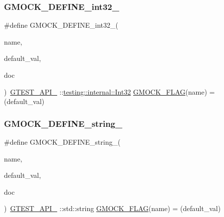 \mbox{\label{gmock-port_8h_a19d91081ff0aaab2f60ef1dc2d6e6b34}} 
\subsubsection{\texorpdfstring{G\+M\+O\+C\+K\+\_\+\+D\+E\+F\+I\+N\+E\+\_\+int32\+\_\+}{GMOCK\_DEFINE\_int32\_}}
{\footnotesize\ttfamily \#define G\+M\+O\+C\+K\+\_\+\+D\+E\+F\+I\+N\+E\+\_\+int32\+\_\+(\begin{DoxyParamCaption}\item[{}]{name,  }\item[{}]{default\+\_\+val,  }\item[{}]{doc }\end{DoxyParamCaption})~\hyperlink{gtest-port_8h_aa73be6f0ba4a7456180a94904ce17790}{G\+T\+E\+S\+T\+\_\+\+A\+P\+I\+\_\+} \+::\hyperlink{namespacetesting_1_1internal_a8ee38faaf875f133358abaf9bc056cec}{testing\+::internal\+::\+Int32} \hyperlink{gmock-port_8h_ad7119adfef06be5e7b1551633f5a1436}{G\+M\+O\+C\+K\+\_\+\+F\+L\+AG}(name) = (default\+\_\+val)}

\mbox{\label{gmock-port_8h_ad6badbf90e5a813e2bd5668fc6b6a8f7}} 
\subsubsection{\texorpdfstring{G\+M\+O\+C\+K\+\_\+\+D\+E\+F\+I\+N\+E\+\_\+string\+\_\+}{GMOCK\_DEFINE\_string\_}}
{\footnotesize\ttfamily \#define G\+M\+O\+C\+K\+\_\+\+D\+E\+F\+I\+N\+E\+\_\+string\+\_\+(\begin{DoxyParamCaption}\item[{}]{name,  }\item[{}]{default\+\_\+val,  }\item[{}]{doc }\end{DoxyParamCaption})~\hyperlink{gtest-port_8h_aa73be6f0ba4a7456180a94904ce17790}{G\+T\+E\+S\+T\+\_\+\+A\+P\+I\+\_\+} \+::std\+::string \hyperlink{gmock-port_8h_ad7119adfef06be5e7b1551633f5a1436}{G\+M\+O\+C\+K\+\_\+\+F\+L\+AG}(name) = (default\+\_\+val)}

